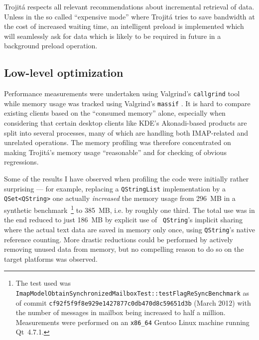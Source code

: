 \documentclass[trojita]{subfiles}
\begin{document}
Trojitá respects all relevant recommendations about incremental retrieval of data.  Unless in the so called ``expensive
mode'' where Trojitá tries to save bandwidth at the cost of increased waiting time, an intelligent preload is
implemented which will seamlessly ask for data which is likely to be required in future in a background preload
operation.

\subsection{Low-level optimization}

Performance measurements were undertaken using Valgrind's \cite{valgrind} {\tt callgrind} \cite{valgrind-callgrind} tool
while memory usage was tracked using Valgrind's {\tt massif} \cite{valgrind-massif}.  It is hard to compare existing
clients based on the ``consumed memory'' alone, especially when considering that certain desktop clients like KDE's
Akonadi-based \cite{akonadi} products are split into several processes, many of which are handling both IMAP-related and
unrelated operations.  The memory profiling was therefore concentrated on making Trojitá's memory usage ``reasonable''
and for checking of obvious regressions.

Some of the results I have observed when profiling the code were initially rather surprising --- for example, replacing
a {\tt QStringList} implementation by a {\tt QSet<QString>} one actually {\em increased} the memory usage from 296~MB in
a synthetic benchmark~\footnote{The test used was {\tt ImapModelObtainSynchronizedMailboxTest::testFlagReSyncBenchmark}
as of commit {\tt cf92f5f9f8e929e1427877c0db470d8c59651d3b} (March 2012) with the number of messages in mailbox being
increased to half a million.  Measurements were performed on an {\tt x86\_64} Gentoo Linux machine running Qt~4.7.1.} to
385~MB, i.e. by roughly one third.  The total use was in the end reduced to just 186~MB by explicit use of {\tt
QString}'s implicit sharing where the actual text data are saved in memory only once, using {\tt QString}'s native
reference counting.  More drastic reductions could be performed by actively removing unused data from memory, but no
compelling reason to do so on the target platforms was observed.
\end{document}
